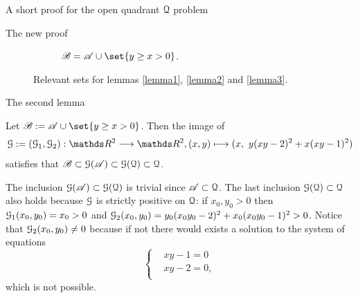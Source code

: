 \documentclass[11pt, a4paper, english, twoside, notitlepage, openright]{report}
\begin{document}
\begin{chapter}{A short proof for the open quadrant $\mathcal{Q}$ problem}
\begin{section}{The new proof}
\begin{figure}[h]
\begin{subfigure}{.75\linewidth}
\caption{$\mathscr{B} = \mathscr{A} \cup \set{y \ge x > 0}$.\label{fig:setB}}
\end{subfigure}
\caption{Relevant sets for lemmas \ref{lemma1}, \ref{lemma2} and \ref{lemma3}.\label{fig:setsAB}}
\end{figure}

\begin{subsection}{The second lemma}
\begin{lemma}\label{lemma2}
Let $\mathscr{B} :=  \mathscr{A} \cup \set{y \ge x > 0}$. Then the image of 
$$
\GG := (\GG_1, \GG_2): \R^2 \longrightarrow \R^2, (x, y) \longmapsto (x,\ y(xy - 2)^2 + x (xy - 1)^2)
$$
satisfies that $\mathscr{B} \subset \mathcal{G}(\mathscr{A}) \subset \mathcal{G}(\mathcal{Q}) \subset \mathcal{Q}$.
\begin{Proof}
The inclusion $\mathcal{G}(\mathscr{A}) \subset \mathcal{G}(\mathcal{Q})$ is trivial since $\mathscr{A} \subset \mathcal{Q}$. The last inclusion $\mathcal{G}(\mathcal{Q}) \subset \mathcal{Q}$ also holds because $\mathcal{G}$ is strictly positive on $\mathcal{Q}$: if $x_0, y_0 > 0$ then $\mathcal{G}_1(x_0, y_0) = x_0 > 0$ and $\mathcal{G}_2(x_0, y_0) = y_0(x_0y_0 - 2)^2 + x_0 (x_0y_0 - 1)^2 > 0$. Notice that $\mathcal{G}_2(x_0, y_0) \ne 0$ because if not there would exists a solution to the system of equations
\begin{equation*}
\left\{
\begin{aligned}
&xy - 1 = 0\\
&xy - 2 = 0,\\
\end{aligned}
\right.
\end{equation*}
which is not possible.


\end{Proof}
\end{lemma}
\end{subsection}
\end{section}
\end{chapter}
\end{document}

